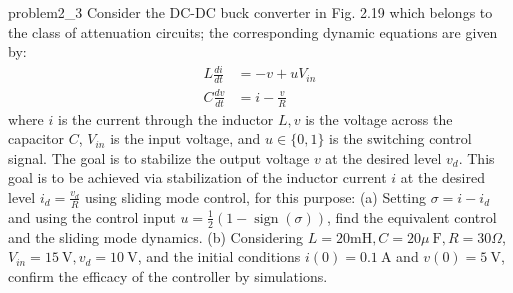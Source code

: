 
\begin{problem}{2.3}{problem2_3}
Consider the DC-DC buck converter in Fig. 2.19 which belongs to the class of attenuation circuits; the corresponding dynamic equations are given by:
$$
	\begin{aligned}
		L \frac{d i}{d t} & =-v+u V_{i n}  \\
		C \frac{d v}{d t} & =i-\frac{v}{R}
	\end{aligned}
$$
where $i$ is the current through the inductor $L, v$ is the voltage across the capacitor $C$, $V_{i n}$ is the input voltage, and $u \in\{0,1\}$ is the switching control signal. The goal is to stabilize the output voltage $v$ at the desired level $v_d$. This goal is to be achieved via stabilization of the inductor current $i$ at the desired level $i_d=\frac{v_d}{R}$ using sliding mode control, for this purpose:
(a) Setting $\sigma=i-i_d$ and using the control input $u=\frac{1}{2}(1-\operatorname{sign}(\sigma))$, find the equivalent control and the sliding mode dynamics.
(b) Considering $L=20 \mathrm{mH}, C=20 \mu \mathrm{~F}, R=30 \Omega$, $V_{i n}=15 \mathrm{~V}, v_d=10 \mathrm{~V}$, and the initial conditions $i(0)=0.1 \mathrm{~A}$ and $v(0)=5 \mathrm{~V}$, confirm the efficacy of the controller by simulations.
\end{problem}